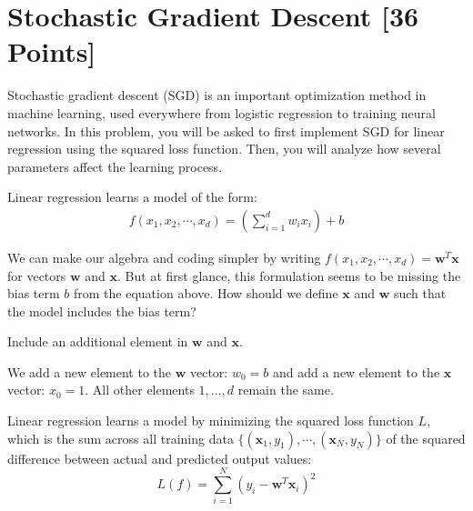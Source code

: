 
\newpage
\section{Stochastic Gradient Descent [36 Points]}

Stochastic gradient descent (SGD) is an important optimization method in machine learning, used everywhere from logistic regression to training neural networks. In this problem, you will be asked to first implement SGD for linear regression using the squared loss function. Then, you will analyze how several parameters affect the learning process.

Linear regression learns a model of the form:
\begin{align*}
  f(x_1, x_2, \cdots, x_d) = \left(\sum_{i=1}^d w_i x_i\right) + b
\end{align*}

\begin{problem}[2]
  We can make our algebra and coding simpler by writing $f(x_1, x_2, \cdots, x_d) = \mathbf{w}^T\mathbf{x}$ for vectors $\mathbf{w}$ and $\mathbf{x}$.  But at first glance, this formulation seems to be missing the bias term $b$ from the equation above.  How should we define $\mathbf{x}$ and $\mathbf{w}$ such that the model includes the bias term?
\end{problem}
\begin{hint}
  Include an additional element in $\mathbf{w}$ and $\mathbf{x}$.
\end{hint}
\begin{solution}
  We add a new element to the $\mathbf{w}$ vector: $w_0=b$ and add a new element to the $\mathbf{x}$ vector: $x_0=1$. All other elements $1,\hdots,d$ remain the same.
\end{solution}

Linear regression learns a model by minimizing the squared loss function $L$, which is the sum across all training data $\{(\mathbf{x}_1, y_1),\cdots,(\mathbf{x}_N, y_N)\}$ of the squared difference between actual and predicted output values:
\[L(f) = \sum_{i=1}^N (y_i - \mathbf{w}^T\mathbf{x}_i)^2\]

